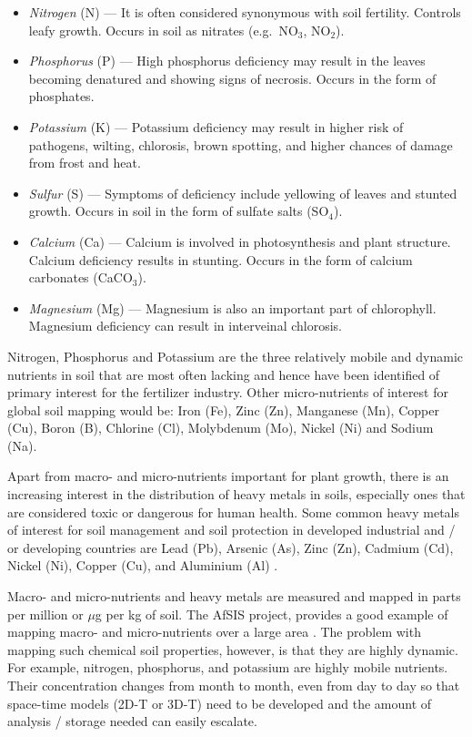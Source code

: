 \documentclass[graybox,natbib,nospthms,UStrade]{svmono}
\let\BeginKnitrBlock\begin \let\EndKnitrBlock\end
\let\BeginKnitrBlock\begin \let\EndKnitrBlock\end
\begin{document}
\begin{itemize}
\item
  \emph{Nitrogen} (N) --- It is often considered synonymous with
  soil fertility. Controls leafy growth. Occurs in soil as
  nitrates (e.g.~NO\(_3\), NO\(_2\)).
\item
  \emph{Phosphorus} (P) --- High phosphorus deficiency may result in the
  leaves becoming denatured and showing signs of necrosis. Occurs in
  the form of phosphates.
\item
  \emph{Potassium} (K) --- Potassium deficiency may result in higher risk of
  pathogens, wilting, chlorosis, brown spotting, and higher chances of
  damage from frost and heat.
\item
  \emph{Sulfur} (S) --- Symptoms of deficiency include yellowing of leaves
  and stunted growth. Occurs in soil in the form of sulfate salts
  (SO\(_4\)).
\item
  \emph{Calcium} (Ca) --- Calcium is involved in photosynthesis and
  plant structure. Calcium deficiency results in stunting. Occurs in
  the form of calcium carbonates (CaCO\(_3\)).
\item
  \emph{Magnesium} (Mg) --- Magnesium is also an important part
  of chlorophyll. Magnesium deficiency can result in
  interveinal chlorosis.
\end{itemize}

\BeginKnitrBlock{rmdnote}
Nitrogen, Phosphorus and Potassium are the three relatively mobile and
dynamic nutrients in soil that are most often lacking and hence have
been identified of primary interest for the fertilizer industry. Other
micro-nutrients of interest for global soil mapping would be: Iron (Fe),
Zinc (Zn), Manganese (Mn), Copper (Cu), Boron (B), Chlorine (Cl),
Molybdenum (Mo), Nickel (Ni) and Sodium (Na).
\EndKnitrBlock{rmdnote}

Apart from macro- and micro-nutrients important for plant growth, there
is an increasing interest in the distribution of heavy metals in soils,
especially ones that are considered toxic or dangerous for human health.
Some common heavy metals of interest for soil management and soil
protection in developed industrial and / or developing countries are
Lead (Pb), Arsenic (As), Zinc (Zn), Cadmium (Cd), Nickel (Ni), Copper
(Cu), and Aluminium (Al)
\citep{Markus2001399, reimann2011statistical, Morel2005202, Rodriguez-Lado23082013, hengl2017soil}.

Macro- and micro-nutrients and heavy metals are measured and mapped in
parts per million or \(\mu\)g per kg of soil. The AfSIS project, provides a good
example of mapping macro- and micro-nutrients over a large area \citep{hengl2017soil}. The
problem with mapping such chemical soil properties, however, is that they
are highly dynamic. For example, nitrogen, phosphorus, and potassium are
highly mobile nutrients. Their concentration changes from month to
month, even from day to day so that space-time models (2D-T or 3D-T)
need to be developed and the amount of analysis / storage needed can
easily escalate.
\end{document}
